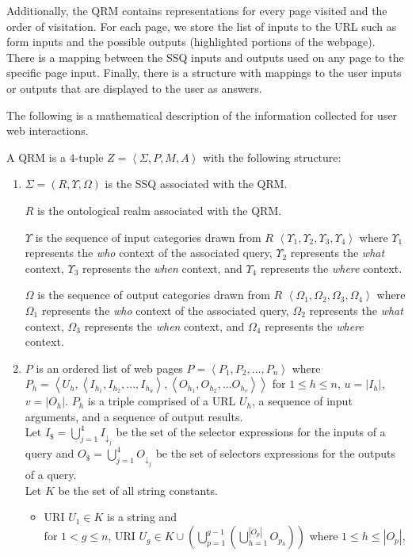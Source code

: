 Additionally, the QRM contains representations for every page visited
and the order of visitation.  For each page, we store the list of
inputs to the URL such as form inputs and the possible outputs
(highlighted portions of the webpage).  There is a mapping between the
SSQ inputs and outputs used on any page to the specific page input.
Finally, there is a structure with mappings to the user inputs or
outputs that are displayed to the user as answers.

The following is a mathematical description of the information
collected for user web interactions.

A QRM is a 4-tuple $Z = \left< \Sigma, P, M, A
\right>$ with the following structure:

\begin{enumerate}

\item $\Sigma = ( R, \Upsilon, \Omega )$ is the SSQ associated with the QRM.

  $R$ is the ontological realm associated with the QRM. 

  $\Upsilon$ is the sequence of input categories drawn from $R$
  $\left< \Upsilon_{1}, \Upsilon_{2}, \Upsilon_{3}, \Upsilon_{4}
  \right>$ where $\Upsilon_{1}$ represents the \emph{who} context of
  the associated query, $\Upsilon_{2}$ represents the \emph{what}
  context, $\Upsilon_{3}$ represents the \emph{when} context, and
  $\Upsilon_{4}$ represents the \emph{where} context.

  $\Omega$ is the sequence of output categories drawn from $R$
  $\left<\Omega_{1}, \Omega_{2}, \Omega_{3}, \Omega_{4}\right>$ where
  $\Omega_{1}$ represents the \emph{who} context of the associated
  query, $\Omega_{2}$ represents the \emph{what} context, $\Omega_{3}$
  represents the \emph{when} context, and $\Omega_{4}$ represents the
  \emph{where} context.

\item $P$ is an ordered list of web pages $P = \left<P_1,P_2,...,
  P_n\right>$ where $P_h =
  \left<U_h,\left<I_{h_1},I_{h_2},...,I_{h_u}\right>,\left<O_{h_1},O_{h_2},...O_{h_v}\right>\right>$
  for $1 \leq h \leq n$, $u = \left| I_h \right|$, $v = \left| O_h
  \right|$. $P_h$ is a triple comprised of a URL $U_h$, a sequence of
  input arguments, and a sequence of output results.  \\ Let $I_{\$} =
  \bigcup_{j=1}^{4} I_{\downarrow_j}$ be the set of the selector
  expressions for the inputs of a query and $O_{\$} =
  \bigcup_{j=1}^{4} O_{\downarrow_j}$ be the set of selectors
  expressions for the outputs of a query.  \\ Let $K$ be the set of
  all string constants.
\begin{itemize}
\item URI $U_1 \in K$ is a string and \\ for $1 < g \leq n$, URI $U_g
  \in K \cup \left( \bigcup^{g-1}_{p=1} \left(
  \bigcup^{\left|O_p\right|}_{h=1}O_{p_h} \right)\right)$ where $1
  \leq h \leq \left| O_p \right| $,


\end{itemize}
\end{enumerate}
